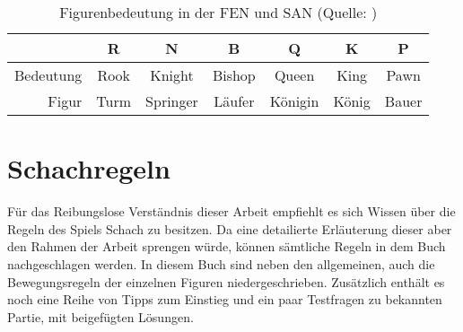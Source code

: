 \begin{table}[H]
	\captionsetup{justification=centering}
	\caption{Figurenbedeutung in der FEN und SAN (Quelle: \cite[Tabelle~2.1]{kretzschmar})}
	\label{tab:pieces}
	\begin{tabu}{|r|c|c|c|c|c|c|}
		\rowfont[c]{\bfseries}
		\hline
		& R & N & B & Q & K & P \\
		\hline
		Bedeutung & Rook & Knight & Bishop & Queen & King & Pawn \\\hline
		Figur & Turm & Springer & Läufer & Königin & König & Bauer \\\hline
	\end{tabu}
\end{table}

\section{Schachregeln}
Für das Reibungslose Verständnis dieser Arbeit empfiehlt es sich Wissen über die Regeln des Spiels Schach zu besitzen. Da eine detailierte Erläuterung dieser aber den Rahmen der Arbeit sprengen würde, können sämtliche Regeln in dem Buch \cite{learnChess} nachgeschlagen werden. In diesem Buch sind neben den allgemeinen, auch die Bewegungsregeln der einzelnen Figuren niedergeschrieben. Zusätzlich enthält es noch eine Reihe von Tipps zum Einstieg und ein paar Testfragen zu bekannten Partie, mit beigefügten Lösungen.